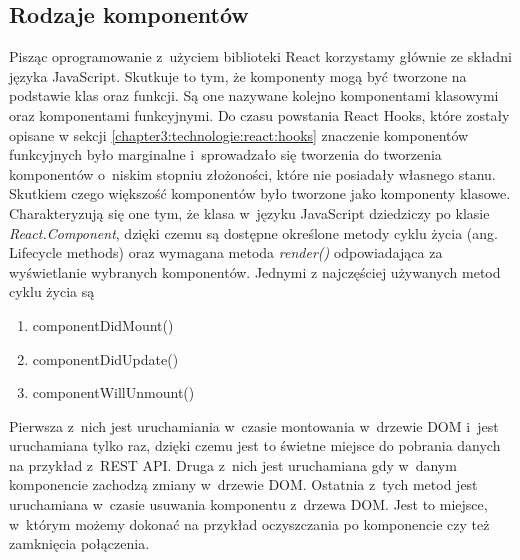 \documentclass[../Kamil_Kowalewski_Main.tex]{subfiles}
\begin{document}
{{        \subsection{Rodzaje komponentów}
        \label{chapter3:technologie:react:komponenty} {
            Pisząc oprogramowanie z~użyciem biblioteki React korzystamy głównie ze składni
            języka JavaScript. Skutkuje to tym, że komponenty mogą być tworzone na
            podstawie klas oraz funkcji. Są one nazywane kolejno komponentami klasowymi
            oraz komponentami funkcyjnymi. Do czasu powstania React Hooks, które
            zostały opisane w sekcji \ref{chapter3:technologie:react:hooks} znaczenie
            komponentów funkcyjnych było marginalne i~sprowadzało się tworzenia do
            tworzenia komponentów o~niskim stopniu złożoności, które nie posiadały
            własnego stanu. Skutkiem czego większość komponentów było tworzone jako
            komponenty klasowe. Charakteryzują się one tym, że klasa w~języku
            JavaScript dziedziczy po klasie \textit{React.Component}, dzięki czemu są
            dostępne określone metody cyklu życia (ang. Lifecycle methods) oraz
            wymagana metoda \textit{render()} odpowiadająca za wyświetlanie wybranych
            komponentów. Jednymi z najczęściej używanych metod cyklu życia są
            \begin{enumerate}
                \item componentDidMount()
                \item componentDidUpdate()
                \item componentWillUnmount()
            \end{enumerate}
            Pierwsza z~nich jest uruchamiania w~czasie montowania w~drzewie DOM i~jest
            uruchamiana tylko raz, dzięki czemu jest to świetne miejsce do pobrania
            danych na przykład z~REST API. Druga z~nich jest uruchamiana gdy w~danym
            komponencie zachodzą zmiany w~drzewie DOM. Ostatnia z~tych metod jest uruchamiana
            w~czasie usuwania komponentu z~drzewa DOM. Jest to miejsce, w~którym możemy
            dokonać na przykład oczyszczania po komponencie czy też zamknięcia połączenia.

}}}
\end{document}
